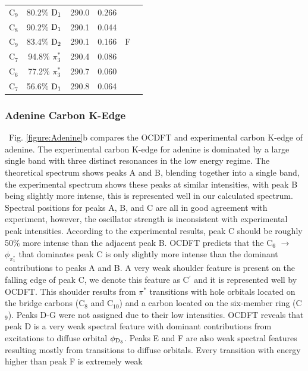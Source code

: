 \documentclass[12pt]{article}
\begin{document}
\begin{table}[!ht]
\begin{tabular*}{8.5cm}{@{\extracolsep{\fill} }cccccc}
    C$_9$
 &   80.2$\%$ $\rm D_1$  & 290.0 & 0.266 & \multirow{5}{*}{F} \\
    C$_8$
 &   90.2$\%$ $\rm D_1$  & 290.1 & 0.044 \\
    C$_9$
 &   83.4$\%$ $\rm D_2$  & 290.1 & 0.166
 \vspace{0.05in}\\
    C$_7$
 &   94.8$\%$ $\pi_3^*$  & 290.4 & 0.086  & \multirow{3}{*}{G} \\
    C$_6$
 &   77.2$\%$ $\pi_3^*$  & 290.7 & 0.060 \\
    C$_7$
 &   56.6$\%$ $\rm D_1$  & 290.8& 0.064 \\
 \hline
 \hline
   \end{tabular*}
 \label{fig: adenine_k_nitrogen}
 \end{table}
\subsubsection{Adenine Carbon K-Edge}
\ Fig. \ref{figure:Adenine}b compares the OCDFT and experimental carbon K-edge of adenine. The experimental carbon K-edge for adenine is dominated by a large single band with three distinct resonances in the low energy regime. The theoretical spectrum shows peaks A and B, blending together into a single band, the experimental spectrum shows these peaks at similar intensities, with peak B being slightly more intense, this is represented well in our calculated spectrum. Spectral positions for peaks A, B, and C are all in good agreement with experiment, 
however, the oscillator strength is inconsistent with experimental peak intensities. According to the experimental results, peak C should be roughly 50\% more intense than the adjacent peak B. OCDFT predicts that the C$_6$ $\rightarrow$ $\phi_{\pi^*_1}$ that dominates peak C is only slightly more intense than the dominant contributions to peaks A and B. A very weak shoulder feature is present on the falling edge of peak C, we denote this feature as C$^{\prime}$ and it is represented well by OCDFT. This shoulder results from $\pi^*$ transitions with hole orbitals located on the bridge carbons (C$_8$ and C$_{10}$) and a carbon located on the six-member ring (C$_9$). Peaks D-G were not assigned due to their low intensities. OCDFT reveals that peak D is a very weak spectral feature with dominant contributions from excitations to diffuse orbital $\phi_{\rm D_3}$. Peaks E and F are also weak spectral features resulting mostly from transitions to diffuse orbitals. Every transition with energy higher than peak F is extremely weak 
\end{document}
